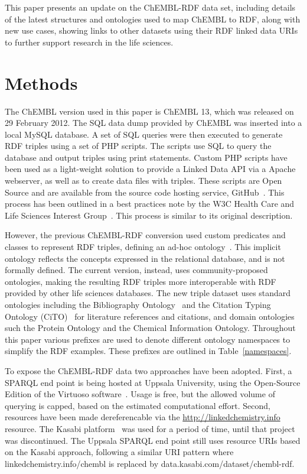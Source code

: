 \documentclass[10pt]{bmc_article}
\newenvironment{bmcformat}{\begin{raggedright}\baselineskip20pt\sloppy\setboolean{publ}{false}}{\end{raggedright}\baselineskip20pt\sloppy}
\begin{document}
\begin{bmcformat}
This paper presents an update on the ChEMBL-RDF data set, including details of the latest structures
and ontologies used to map ChEMBL to RDF, along with new use cases, showing 
links to other datasets using their RDF linked data URIs to further support research in the life sciences.

\section*{Methods}
\label{s2}

The ChEMBL version used in this paper is ChEMBL 13, which was released on 29 February 2012.
The SQL data dump provided by ChEMBL was inserted into a local MySQL database. A set of SQL queries 
were then executed to generate RDF triples using a set of PHP scripts. The scripts use SQL to
query the database and output triples using print statements. Custom PHP scripts have been used
as a light-weight solution to provide a Linked Data API via a Apache webserver, as well as to
create data files with triples. These scripts are Open Source 
and are available from the source code hosting service, GitHub~\cite{ChEMBLRDFGitHub}. This process 
has been outlined in a best practices note by the W3C Health Care and Life Sciences Interest
Group~\cite{Marshall2012}. This process is similar to its original description.

However, the previous ChEMBL-RDF conversion used custom predicates and classes to represent RDF triples, defining
an ad-hoc ontology~\cite{Willighagen2011}. This implicit ontology reflects the concepts expressed
in the relational database, and is not formally defined. The current version, instead, uses community-proposed
ontologies, making the resulting RDF triples more interoperable with RDF provided by other life sciences databases. 
The new triple dataset uses standard ontologies
including the Bibliography Ontology~\cite{Giasson2011} and the Citation Typing Ontology (CiTO)~\cite{Shotton2010} for literature
references and citations, and domain ontologies such the Protein Ontology\cite{Natale2011} and the Chemical Information
Ontology\cite{Hastings2011}. Throughout this paper various prefixes are used to denote different ontology 
namespaces to simplify the RDF examples. These prefixes are outlined in Table~\ref{namespaces}.

To expose the ChEMBL-RDF data two approaches have been adopted. First, a SPARQL end point is being
hosted at Uppsala University, using the Open-Source Edition of the Virtuoso software~\cite{Virtuoso}. Usage is free, but the
allowed volume of querying is capped, based on the estimated computational effort. Second, resources have
been made dereferencable via the \url{http://linkedchemistry.info} resource. The Kasabi
platform~\cite{kasabi} was used for a period of time, until that project was discontinued.
The Uppsala SPARQL end point still uses resource URIs based on the Kasabi approach, following a similar
URI pattern where linkedchemistry.info/chembl is replaced by data.kasabi.com/dataset/chembl-rdf.


\end{bmcformat}
\end{document}
